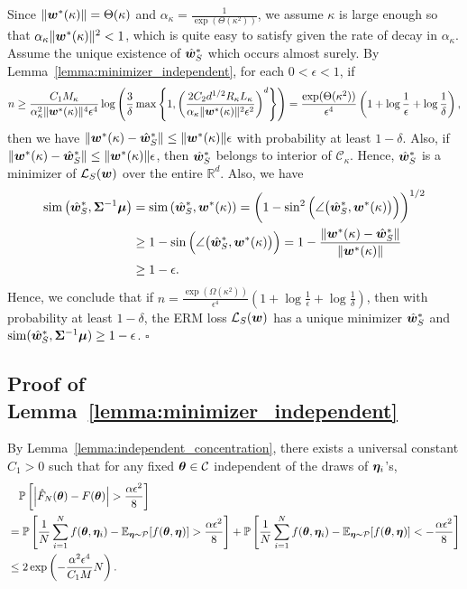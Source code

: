 Since $\lVert {\bm{w}}^*(\kappa) \rVert = \Theta(\kappa)$ and $\alpha_\kappa = \frac{1}{\exp ( \Theta(\kappa^2))}$, we assume $\kappa$ is large enough so that $\alpha_\kappa \lVert {\bm{w}}^*(\kappa) \rVert^2 <1$, which is quite easy to satisfy given the rate of decay in $\alpha_\kappa$. Assume the unique existence of $\hat{{\bm{w}}}_S^*$ which occurs almost surely. By Lemma~\ref{lemma:minimizer_independent}, for each $0<\epsilon<1$, if 
\begin{equation*}
n \geq \frac{C_1M_\kappa}{\alpha_\kappa ^2 \lVert {\bm{w}}^*(\kappa) \rVert^4 \epsilon^4} \log \left(\frac{3}{\delta} \max \left\{1, \left(\frac{2 C_2d^{1/2}R_\kappa L_\kappa}{\alpha_\kappa \lVert {\bm{w}}^*(\kappa)\rVert^2 \epsilon^2}\right)^d \right\}   \right) = \frac{\exp(\Theta(\kappa^2)) }{\epsilon^4} \left ( 1+ \log\frac{1}{\epsilon} + \log\frac{1}{\delta} \right ),
\end{equation*}
then we have $\lVert {\bm{w}}^*(\kappa)- \hat{{\bm{w}}}_S^* \rVert \leq  \lVert {\bm{w}}^*(\kappa)\rVert \epsilon$ with probability at least $1-\delta$. Also, if $\lVert {\bm{w}}^*(\kappa)- \hat{{\bm{w}}}_S^* \rVert \leq  \lVert {\bm{w}}^*(\kappa)\rVert \epsilon$, then $\hat{{\bm{w}}}_S^*$ belongs to interior of $\mathcal{C}_\kappa$. Hence, $\hat{{\bm{w}}}_S^*$ is a minimizer of $\mathcal{L}_S({\bm{w}})$ over the entire $\mathbb{R}^d$. Also, we have
\begin{align*}
    \mathrm{sim} \left ( \hat{{\bm{w}}}_S^*, {\bm{\Sigma}}^{-1}{\bm{\mu}} \right) 
    &=  \mathrm{sim} \left( \hat{{\bm{w}}}_S^*,{\bm{w}}^*(\kappa) \right)
    = \bigg (1- \sin^2  \Big(\angle\big(\hat{{\bm{w}}}_S^*, {\bm{w}}^*(\kappa)\big) \Big ) \bigg )^{1/2}\\
    &\geq 1- \sin \Big (\angle\big(\hat{{\bm{w}}}_S^*, {\bm{w}}^*(\kappa)\big) \Big ) = 1-\frac{\lVert {\bm{w}}^*(\kappa) - \hat{{\bm{w}}}_S^* \rVert}{\lVert {\bm{w}}^*(\kappa) \rVert}\\
    &\geq 1- \epsilon.
\end{align*}
Hence, we conclude that if $n = \frac{\exp(\Omega(\kappa^2)) }{\epsilon^4}\left(1+ \log\frac{1}{\epsilon} + \log\frac{1}{\delta}\right)$, then
with probability at least $1-\delta$, the ERM loss $\mathcal{L}_S({\bm{w}})$ has a unique minimizer $\hat{{\bm{w}}}_S^*$ and $\mathrm{sim} ( \hat{{\bm{w}}}_S^*, {\bm{\Sigma}}^{-1}{\bm{\mu}})\geq 1- \epsilon$. \hfill $\square$


\subsection{Proof of Lemma~\ref{lemma:minimizer_independent}}
By Lemma~\ref{lemma:independent_concentration}, there exists a universal constant $C_1>0$ such that for any fixed ${\bm{\theta}} \in \mathcal{C}$ independent of the draws of ${\bm{\eta}}_i$'s,
\begin{align}
\label{eq:lemmaminimizer_independent-2}
    &\quad \mathbb{P}\left[ \left| \hat{F}_N({\bm{\theta}}) - F({\bm{\theta}})\right| > \frac{\alpha \epsilon^2}{8} \right]\nonumber \\
    &= \mathbb{P}\left[ \frac{1}{N} \sum_{i=1}^N f
({\bm{\theta}}, {\bm{\eta}}_i)- \mathbb{E}_{{\bm{\eta}} \sim \mathcal{P}}[f({\bm{\theta}},{\bm{\eta}})] > \frac{\alpha \epsilon^2}{8} \right] +  \mathbb{P}\left[ \frac{1}{N} \sum_{i=1}^N f
({\bm{\theta}}, {\bm{\eta}}_i)- \mathbb{E}_{{\bm{\eta}} \sim \mathcal{P}}[f({\bm{\theta}},{\bm{\eta}})] < -\frac{\alpha \epsilon^2}{8} \right]\nonumber \\
    &\leq 2\exp \left(-\frac{\alpha^2 \epsilon^4}{C_1 M}N\right).
\end{align}

